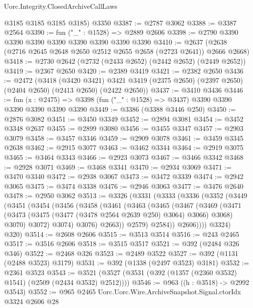 \begin{lexlean}{Uorc.Integrity.ClosedArchiveCallLaws}
\begin{coremodule}
      @3185
      @3185
      @3185
      @3185)
    @3350
@3387 := @2787 @3062
@3388 := @3387 @2564
@3390 := fun ("_" : @1528) => @2889 @2606
@3398 := @2790 @3390 @3390 @3390 @3390 @3390 @3390 @3390 @3390
@3410 := @2637 (@2638 (@2716 @2645 @2648 @2650 @2512 @2655 @2658 (@2723 @2641)) @2666 @2668)
@3418 := @2730 @2642 (@2732 (@2433 @2652) (@2442 @2652) (@2449 @2652))
@3419 := @2367 @2650
@3420 := @2389 @3419
@3421 := @2382 @2650
@3436 := @2472
    (@3418
      (@3420 @3421)
      @3421
      @3419
      (@2375 @2650)
      (@2397 @2650)
      (@2404 @2650)
      (@2413 @2650)
      (@2422 @2650))
@3437 := @3410 @3436
@3446 := fun (x : @2475) => @3398 (fun ("_" : @1528) => @3437) @3390 @3390 @3390 @3390 @3390 @3390
@3449 := @3386 (@3388 @3446 @250)
@3450 := @2876 @3082
@3451 := @3450 @3349
@3452 := @2894 @3081
@3454 := @3452 @3348 @2637
@3455 := @2899 @3080
@3456 := @3455 @3347
@3457 := @2903 @3079
@3458 := @3457 @3346
@3459 := @2909 @3078
@3461 := @3459 @3345 @2638
@3462 := @2915 @3077
@3463 := @3462 @3344
@3464 := @2919 @3075
@3465 := @3464 @3343
@3466 := @2923 @3073
@3467 := @3466 @3342
@3468 := @2928 @3071
@3469 := @3468 @3341
@3470 := @2934 @3069
@3471 := @3470 @3340
@3472 := @2938 @3067
@3473 := @3472 @3339
@3474 := @2942 @3065
@3475 := @3474 @3338
@3476 := @2946 @3063
@3477 := @3476 @2640
@3478 := @2950 @3062
@3513 := @3326
    (@3331
      (@3333
        (@3336
          (@3352
            (@3449
              (@3451
                (@3454
                  (@3456
                    (@3458
                      (@3461
                        (@3463
                          (@3465
                            (@3467
                              (@3469
                                (@3471
                                  (@3473 (@3475 (@3477 (@3478 @2564 @2639 @250) @3064) @3066) @3068)
                                  @3070)
                                @3072)
                              @3074)
                            @3076)
                          @2663))
                      @2579)
                    @2584))
                @2606))))
        @3324)
      @320)
@3514 := @2608 @2606
@3515 := @3513 @3514
@3516 := @243 @2465
@3517 := @3516 @2606
@3518 := @3515 @3517
@3521 := @392 (@2484 @326 @346)
@3522 := @2468 @326
@3523 := @2489 @3522
@3527 := @392 (@1131 (@2488 @3523) @3179)
@3531 := @392 (@1338 (@2497 @3523) @3181)
@3532 := @2361 @3523
@3543 := @3521 (@3527 (@3531 (@392 (@1357 (@2360 @3532) @1541) (@2509 (@2434 @3532) @2512))))
@3546 := @963 ((h : @3518) -> @2992 @3543)
@3552 := @965 @2465 Uorc.Uorc.Wire.ArchiveSnapshot.Signal.ctorIdx @3324 @2606 @28

\end{coremodule}
\end{lexlean}
